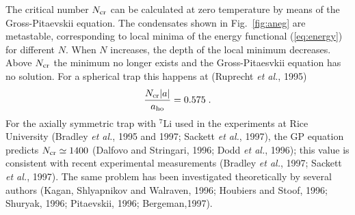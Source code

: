 The critical number $N_{\rm cr}$ can be calculated at zero temperature
by means of the Gross-Pitaevskii equation.  The condensates shown in 
Fig.~\ref{fig:aneg} are metastable, corresponding to local minima of the
energy functional (\ref{eq:energy}) for different $N$. When $N$
increases, the depth of the local minimum decreases.  Above $N_{\rm cr}$
the minimum no longer exists and the Gross-Pitaesvkii equation
has no solution. For a spherical trap this happens at  (Ruprecht
{\it et al.}, 1995)
\begin{equation}
{ N_{\rm cr} |a| \over a_{\rm ho} } = 0.575 \;.
\label{eq:Ncr}
\end{equation}
For the axially symmetric trap with $^7$Li used in the experiments at
Rice University  (Bradley {\it et al.}, 1995 and 1997; Sackett {\it et 
al.}, 1997), the GP equation predicts $N_{\rm cr} \simeq 1400$ (Dalfovo 
and Stringari, 1996; Dodd {\it et al.}, 1996);  this value is consistent 
with recent experimental measurements  (Bradley {\it et al.}, 1997; 
Sackett {\it et al.}, 1997). The same problem has been investigated 
theoretically by several authors (Kagan, Shlyapnikov and Walraven, 1996; 
Houbiers and Stoof, 1996; Shuryak, 1996; Pitaevskii, 1996; Bergeman,1997).  

